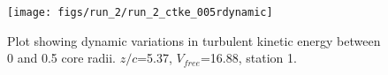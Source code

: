 \begin{figure}[H]
\centering
\texttt{[image: figs/run\_2/run\_2\_ctke\_005rdynamic]}
\caption{Plot showing dynamic variations in turbulent kinetic energy between 0 and 0.5 core radii. $z/c$=5.37, $V_{free}$=16.88, station 1.}
\label{fig:run_2_ctke_005rdynamic}
\end{figure}


